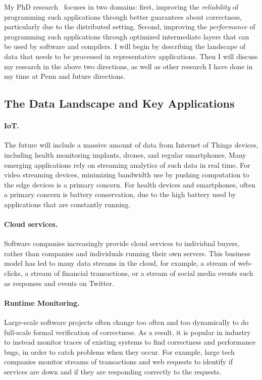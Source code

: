 \documentclass{article}
\begin{document}
My PhD research~\cite{icalp17,tcs20,popl19,pldi19,oopsla20}
focuses in two domains: first, improving the \emph{reliability} of programming such applications through better guarantees about correctness, particularly due to the distributed setting. Second, improving the \emph{performance} of programming such applications through optimized intermediate layers that can be used by software and compilers.
I will begin by describing the landscape of data that needs to be processed in representative applications.
Then I will discuss my research in the above two directions, as well as other research I have done in my time at Penn and future directions.

\subsection*{The Data Landscape and Key Applications}

\paragraph*{IoT.}
The future will include a massive amount of data from Internet of Things devices, including health monitoring implants, drones, and regular smartphones. Many emerging applications rely on streaming analytics of such data in real time. 
For video streaming devices, minimizing bandwidth use by pushing computation to the edge devices is a primary concern.
For health devices and smartphones, often a primary concern is battery conservation, due to the high battery used by applications that are constantly running.

\paragraph*{Cloud services.}
Software companies increasingly provide cloud services to individual buyers,
rather than companies and individuals running their own servers.
This business model has led to many data streams in the cloud, for example,
a stream of web-clicks, a stream of financial transactions,
or a stream of social media events such as responses and events on Twitter.

\paragraph*{Runtime Monitoring.}
Large-scale software projects often change too often and too dynamically to do full-scale formal verification of correctness.
As a result, it is popular in industry to instead monitor traces of existing systems to find correctness and performance bugs, in order to
catch problems when they occur.
For example, large tech companies monitor streams of transactions and web
requests to identify if services are down and if they are responding correctly to the requests.
\end{document}
